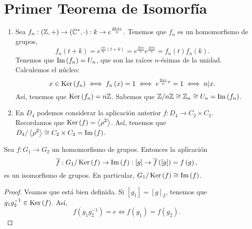 \section{Primer Teorema de Isomorfía}
\begin{eg}
\begin{enumerate}
\item Sea $\displaystyle f_{n} : \left(\mathbb{Z}, + \right) \to \left(\mathbb{C}^{*}, \cdot \right) : k \to e^{\frac{2k\pi i}{n}} $. Tenemos que $\displaystyle f_{n} $ es un homomorfismo de grupos,
	\[ f_{n}\left(t + k\right) = e^{\frac{e\pi i }{n}\left(t+k\right)} = e^{\frac{2t\pi i}{n}} e^{\frac{2k\pi i}{n}} = f_{n}\left(t\right)f_{n}\left(k\right) .\]
	Tenemos que $\displaystyle \operatorname{Im}\left(f_{n}\right) = U_{n} $, que son las raíces $\displaystyle n $-ésimas de la unidad. Calculemos el núcleo:
	\[x \in \operatorname{Ker}\left(f_{n}\right) \iff f_{n}\left(x\right) = 1 \iff e^{\frac{2\pi i}{n}x} = 1 \iff n | x .\]
Así, tenemos que $\displaystyle \operatorname{Ker}\left(f_{n}\right) = n \mathbb{Z} $. Sabemos que $\displaystyle \mathbb{Z}/n\mathbb{Z} \cong \mathbb{Z}_{n} \cong U_{n}= \operatorname{Im}\left(f_{n}\right) $. 	
\item En $\displaystyle D_{4} $ podemos considerar la aplicación anterior $\displaystyle f : D_{4} \to C_{2} \times C_{2} $. Recordamos que $\displaystyle \operatorname{Ker}\left(f\right) = \left\langle \rho^{2} \right\rangle  $. Así, tenemos que $\displaystyle D_{4}/\left\langle \rho^{2} \right\rangle  \cong C_{2} \times C_{2} = \operatorname{Im}\left(f\right)$. 
\end{enumerate}
\end{eg}
\begin{theorem}
Sea $\displaystyle f : G_{1} \to G_{2} $ un homomorfismo de grupos. Entonces la aplicación 
\[ \overline{f} : G_{1} / \operatorname{Ker}\left(f\right) \to \operatorname{Im}\left(f\right) : [g] \to \overline{f}\left([g]\right) = f\left(g\right) ,\]
es un isomorfismo de grupos. En particular, $\displaystyle G_{1}/\operatorname{Ker}\left(f\right) \cong \operatorname{Im}\left(f\right) $.
\end{theorem}
\begin{proof}
	Veamos que está bien definida. Si $\displaystyle [g_{1}] = [g]_{2}$, tenemos que $\displaystyle g_{1}g_{2}^{-1} \in \operatorname{Ker}\left(f\right) $. Así,
	\[f\left(g_{1}g_{2}^{-1}\right) = e \iff f\left(g_{1}\right) = f\left(g_{2}\right) .\]	
\end{proof}


